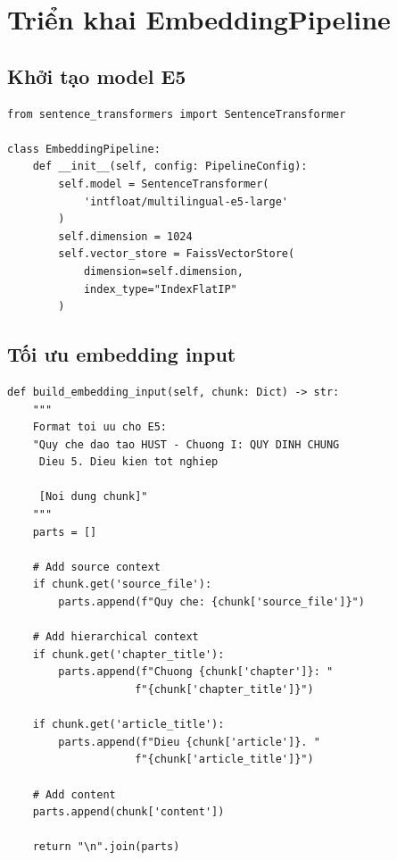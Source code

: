 \documentclass[../DoAn.tex]{subfiles}
\begin{document}
\section{Triển khai EmbeddingPipeline}

\subsection{Khởi tạo model E5}
\begin{verbatim}
from sentence_transformers import SentenceTransformer

class EmbeddingPipeline:
    def __init__(self, config: PipelineConfig):
        self.model = SentenceTransformer(
            'intfloat/multilingual-e5-large'
        )
        self.dimension = 1024
        self.vector_store = FaissVectorStore(
            dimension=self.dimension,
            index_type="IndexFlatIP"
        )
\end{verbatim}

\subsection{Tối ưu embedding input}
\begin{verbatim}
def build_embedding_input(self, chunk: Dict) -> str:
    """
    Format toi uu cho E5:
    "Quy che dao tao HUST - Chuong I: QUY DINH CHUNG
     Dieu 5. Dieu kien tot nghiep
     
     [Noi dung chunk]"
    """
    parts = []
    
    # Add source context
    if chunk.get('source_file'):
        parts.append(f"Quy che: {chunk['source_file']}")
    
    # Add hierarchical context
    if chunk.get('chapter_title'):
        parts.append(f"Chuong {chunk['chapter']}: "
                    f"{chunk['chapter_title']}")
    
    if chunk.get('article_title'):
        parts.append(f"Dieu {chunk['article']}. "
                    f"{chunk['article_title']}")
    
    # Add content
    parts.append(chunk['content'])
    
    return "\n".join(parts)
\end{verbatim}
\end{document}
